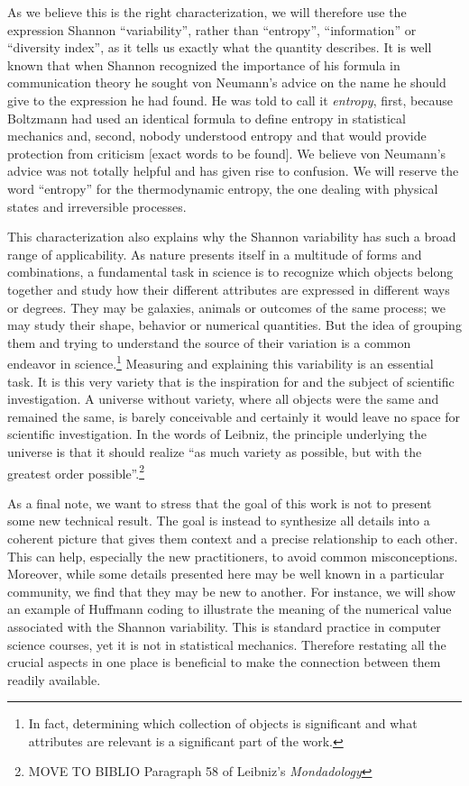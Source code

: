 \documentclass{article}
\begin{document}
As we believe this is the right characterization, we will therefore use the expression Shannon ``variability'', rather than ``entropy'', ``information'' or ``diversity index'', as it tells us exactly what the quantity describes. It is well known that when Shannon recognized the importance of his formula in communication theory he sought von Neumann's advice on the name he should give to the expression he had found. He was told to call it \emph{entropy}, first, because Boltzmann had used an identical formula to define entropy in statistical mechanics and, second, nobody understood entropy and that would provide protection from criticism [exact words to be found]. We believe von Neumann's advice was not totally helpful and has given rise to confusion. We will reserve the word ``entropy'' for the thermodynamic entropy, the one dealing with physical states and irreversible processes.

This characterization also explains why the Shannon variability has such a broad range of applicability. As nature presents itself in a multitude of forms and combinations, a fundamental task in science is to recognize which objects belong together and study how their different attributes are expressed in different ways or degrees. They may be galaxies, animals or outcomes of the same process; we may study their shape, behavior or numerical quantities. But the idea of grouping them and trying to understand the source of their variation is a common endeavor in science.\footnote{In fact, determining which collection of objects is significant and what attributes are relevant is a significant part of the work.} Measuring and explaining this variability is an essential task. It is this very variety that is the inspiration for and the subject of scientific investigation. A universe without variety, where all objects were the same and remained the same, is barely conceivable and certainly it would leave no space for scientific investigation. In the words of Leibniz, the principle underlying the universe is that it should realize ``as much variety as possible, but with the greatest order possible''.\footnote{MOVE TO BIBLIO Paragraph 58 of Leibniz's \emph{Mondadology}} 

As a final note, we want to stress that the goal of this work is not to present some new technical result. The goal is instead to synthesize all details into a coherent picture that gives them context and a precise relationship to each other. This can help, especially the new practitioners, to avoid common misconceptions. Moreover, while some details presented here may be well known in a particular community, we find that they may be new to another. For instance, we will show an example of Huffmann coding to illustrate the meaning of the numerical value associated with the Shannon variability. This is standard practice in computer science courses, yet it is not in statistical mechanics. Therefore restating all the crucial aspects in one place is beneficial to make the connection between them readily available.
\end{document}
